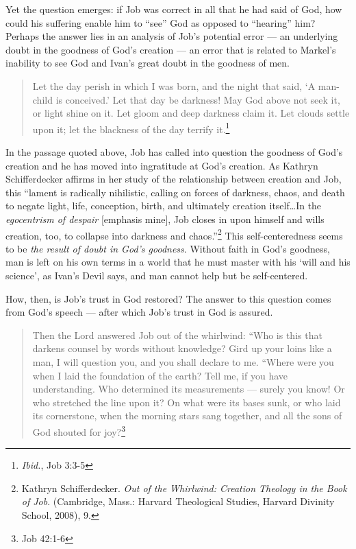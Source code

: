 Yet the question emerges: if Job was correct in all that he had said of God, how could his suffering enable him to ``see'' God as opposed to ``hearing'' him? Perhaps the answer lies in an analysis of Job's potential error --- an underlying doubt in the goodness of God's creation --- an error that is related to Markel's inability to see God and Ivan's great doubt in the goodness of men.
\begin{quote}
\singlespacing
Let the day perish in which I was born, and the night that said, `A man-child is conceived.' Let that day be darkness! May God above not seek it, or light shine on it. Let gloom and deep darkness claim it. Let clouds settle upon it; let the blackness of the day terrify it.\footnote{\emph{Ibid.}, Job 3:3-5}
\end{quote} In the passage quoted above, Job has called into question the goodness of God's creation and he has moved into ingratitude at God's creation. As Kathryn Schifferdecker affirms in her study of the relationship between creation and Job, this ``lament is radically nihilistic, calling on forces of darkness, chaos, and death to negate light, life, conception, birth, and ultimately creation itself\ldots In the \emph{egocentrism of despair} [emphasis mine], Job closes in upon himself and wills creation, too, to collapse into darkness and chaos.''\footnote{Kathryn Schifferdecker. \emph{Out of the Whirlwind: Creation Theology in the Book of Job}. (Cambridge, Mass.: Harvard Theological Studies, Harvard Divinity School, 2008), 9.} This self-centeredness seems to be \emph{the result of doubt in God's goodness}. Without faith in God's goodness, man is left on his own terms in a world that he must master with his `will and his science', as Ivan's Devil says, and man cannot help but be self-centered.

 How, then, is Job's trust in God restored? The answer to this question comes from God's speech --- after which Job's trust in God is assured.

\begin{quote}
\onehalfspacing
Then the Lord answered Job out of the whirlwind: ``Who is this that darkens counsel by words without knowledge? Gird up your loins like a man, I will question you, and you shall declare to me. ``Where were you when I laid the foundation of the earth? Tell me, if you have understanding. Who determined its measurements --- surely you know! Or who stretched the line upon it? On what were its bases sunk, or who laid its cornerstone, when the morning stars sang together, and all the sons of God shouted for joy?\footnote{Job 42:1-6}
\end{quote}

